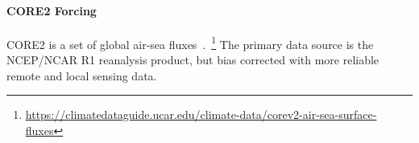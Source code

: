 \paragraph{CORE2 Forcing}
CORE2 is a set of global air-sea fluxes~\cite{griffies2012datasets,large2009global, hurrell2008new, core2, core2expert}.~\footnote{\url{https://climatedataguide.ucar.edu/climate-data/corev2-air-sea-surface-fluxes}}
 The primary data source is the NCEP/NCAR R1 reanalysis product, but bias corrected
 with more reliable remote and local sensing data.
